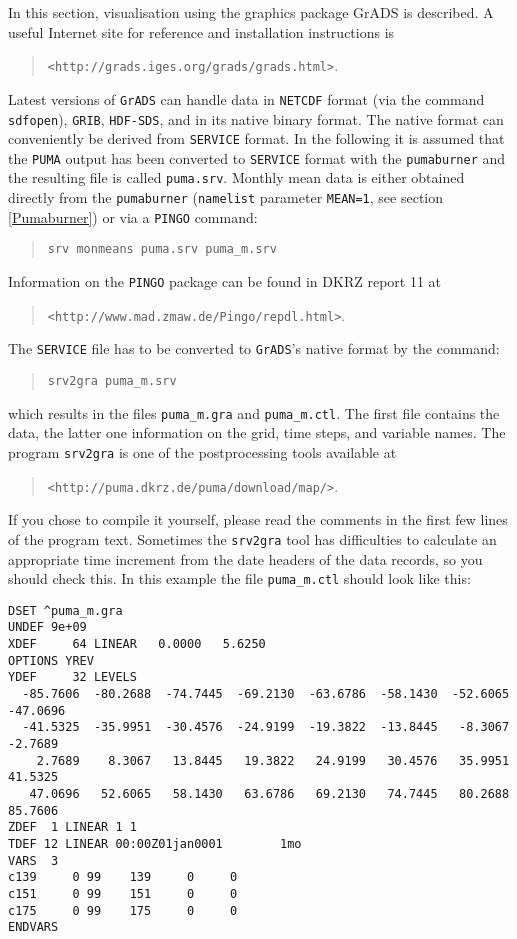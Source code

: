 In this section, visualisation using the graphics package GrADS is
described. A useful Internet site for reference and installation
instructions is
\begin{quote}
\verb#<http://grads.iges.org/grads/grads.html>#.
\end{quote}
Latest versions of \verb#GrADS# can handle data in \verb#NETCDF#
format (via the command
\verb#sdfopen#), \verb#GRIB#, \verb#HDF-SDS#, and in its native binary
format. The native format can
conveniently be derived from \verb#SERVICE# format.
In the following it is assumed that the \verb/PUMA/ output has been
 converted to \verb#SERVICE# format with the \verb#pumaburner# and the
resulting
file is called \verb/puma.srv/. Monthly mean data is either obtained
directly from the \verb#pumaburner# (\verb#namelist# parameter
\verb#MEAN=1#, see section \ref{Pumaburner}) or via a
\verb/PINGO/ command:
\begin{quote}
\verb/srv monmeans puma.srv puma_m.srv/
\end{quote}
\noindent Information on the \verb/PINGO/ package can be
found in DKRZ report 11 at
\begin{quote}
 \verb#<http://www.mad.zmaw.de/Pingo/repdl.html>#.
\end{quote}
The \verb#SERVICE# file has to be converted to
\verb#GrADS#'s native format by the command:
\begin{quote}
\verb#srv2gra puma_m.srv#
\end{quote}
\noindent which results in the files \verb/puma_m.gra/ and
\verb/puma_m.ctl/. The first file contains the data, the latter one
information on the grid, time steps, and variable names. The program
\verb#srv2gra# is one of the postprocessing tools available at
\begin{quote}
\verb#<http://puma.dkrz.de/puma/download/map/>#.
\end{quote}
If you chose to compile it yourself, please read the comments in the
first few lines of the program text.
Sometimes the
\verb/srv2gra/ tool has difficulties to calculate an appropriate time
increment from the date headers of the data records, so you should
check this. In this example the file \verb/puma_m.ctl/ should look like this:
\begin{verbatim}
DSET ^puma_m.gra
UNDEF 9e+09
XDEF     64 LINEAR   0.0000   5.6250
OPTIONS YREV
YDEF     32 LEVELS 
  -85.7606  -80.2688  -74.7445  -69.2130  -63.6786  -58.1430  -52.6065  -47.0696
  -41.5325  -35.9951  -30.4576  -24.9199  -19.3822  -13.8445   -8.3067   -2.7689
    2.7689    8.3067   13.8445   19.3822   24.9199   30.4576   35.9951   41.5325
   47.0696   52.6065   58.1430   63.6786   69.2130   74.7445   80.2688   85.7606
ZDEF  1 LINEAR 1 1
TDEF 12 LINEAR 00:00Z01jan0001        1mo
VARS  3
c139     0 99    139     0     0
c151     0 99    151     0     0
c175     0 99    175     0     0
ENDVARS
\end{verbatim}
